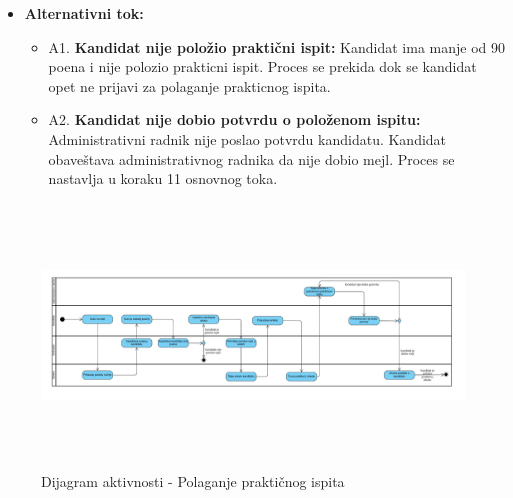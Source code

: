 \begin{itemize}
\begin{enumerate}
   \end{enumerate}

\item \textbf{Alternativni tok:}  
   \begin{itemize}
   \item A1. \textbf{Kandidat nije položio praktični ispit:}
  Kandidat ima manje od 90 poena i nije polozio prakticni ispit. Proces se prekida dok se kandidat opet ne prijavi za polaganje prakticnog ispita. 
  \item A2. \textbf{Kandidat nije dobio potvrdu o položenom ispitu:}
  Administrativni radnik nije poslao potvrdu kandidatu. Kandidat obaveštava administrativnog radnika da nije dobio mejl. Proces se nastavlja u koraku 11 osnovnog toka.
   \end{itemize}

\end{itemize}  

\begin{figure}[H]
  \begin{center}
      \includegraphics[width=140mm, height=70mm]{Diagrams/dijagram_aktivnosti_polaganje_prakticnog_ispita.png}
  \end{center}
  \caption {Dijagram aktivnosti - Polaganje praktičnog ispita}
  \label{activity_polaganje_praktičnog_ispita}

\end{figure}
